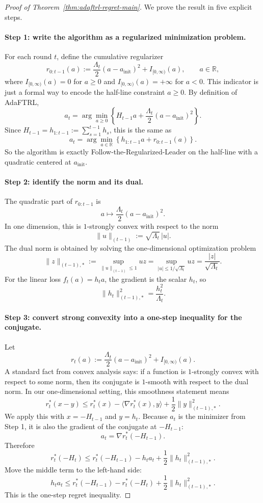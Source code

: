 \documentclass[11pt]{article}
\newcommand{\R}{\mathbb{R}}
\newcommand{\1}{\mathbf{1}}
\begin{document}
\begin{proof}[Proof of Theorem~\ref{thm:adaftrl-regret-main}]
We prove the result in five explicit steps.

\paragraph{Step 1: write the algorithm as a regularized minimization problem.}
For each round $t$, define the cumulative regularizer
\[
r_{0:t-1}(a):=\frac{\Lambda_t}{2}(a-a_{\mathrm{init}})^2 + I_{[0,\infty)}(a),
\qquad a\in\R,
\]
where $I_{[0,\infty)}(a)=0$ for $a\ge 0$ and $I_{[0,\infty)}(a)=+\infty$ for $a<0$.
This indicator is just a formal way to encode the half-line constraint $a\ge 0$.
By definition of AdaFTRL,
\[
a_t
=
\arg\min_{a\ge 0}
\left\{
H_{t-1}a+\frac{\Lambda_t}{2}(a-a_{\mathrm{init}})^2
\right\}.
\]
Since $H_{t-1}=h_{1:t-1}:=\sum_{s=1}^{t-1}h_s$, this is the same as
\[
a_t
=
\arg\min_{a\in\R}
\left\{
h_{1:t-1}a+r_{0:t-1}(a)
\right\}.
\]
So the algorithm is exactly Follow-the-Regularized-Leader on the half-line with a quadratic centered at $a_{\mathrm{init}}$.

\paragraph{Step 2: identify the norm and its dual.}
The quadratic part of $r_{0:t-1}$ is
\[
a\mapsto \frac{\Lambda_t}{2}(a-a_{\mathrm{init}})^2.
\]
In one dimension, this is $1$-strongly convex with respect to the norm
\[
\|u\|_{(t-1)}:=\sqrt{\Lambda_t}\,|u|.
\]
The dual norm is obtained by solving the one-dimensional optimization problem
\[
\|z\|_{(t-1),*}:=\sup_{\|u\|_{(t-1)}\le 1} uz
=\sup_{|u|\le 1/\sqrt{\Lambda_t}} uz
=\frac{|z|}{\sqrt{\Lambda_t}}.
\]
For the linear loss $f_t(a)=h_t a$, the gradient is the scalar $h_t$, so
\[
\|h_t\|_{(t-1),*}^2=\frac{h_t^2}{\Lambda_t}.
\]

\paragraph{Step 3: convert strong convexity into a one-step inequality for the conjugate.}
Let
\[
r_t(a):=\frac{\Lambda_t}{2}(a-a_{\mathrm{init}})^2+I_{[0,\infty)}(a).
\]
A standard fact from convex analysis says: if a function is $1$-strongly convex with respect to some norm, then its conjugate is $1$-smooth with respect to the dual norm. In our one-dimensional setting, this smoothness statement means
\[
r_t^*(x-y)\le r_t^*(x)-\langle \nabla r_t^*(x),y\rangle + \frac12\|y\|_{(t-1),*}^2.
\]
We apply this with $x=-H_{t-1}$ and $y=h_t$. Because $a_t$ is the minimizer from Step 1, it is also the gradient of the conjugate at $-H_{t-1}$:
\[
a_t=\nabla r_t^*(-H_{t-1}).
\]
Therefore
\[
r_t^*(-H_t)
\le
r_t^*(-H_{t-1})-h_t a_t+\frac12\|h_t\|_{(t-1),*}^2.
\]
Move the middle term to the left-hand side:
\[
h_t a_t
\le
r_t^*(-H_{t-1})-r_t^*(-H_t)+\frac12\|h_t\|_{(t-1),*}^2.
\]
This is the one-step regret inequality.


\end{proof}
\end{document}
